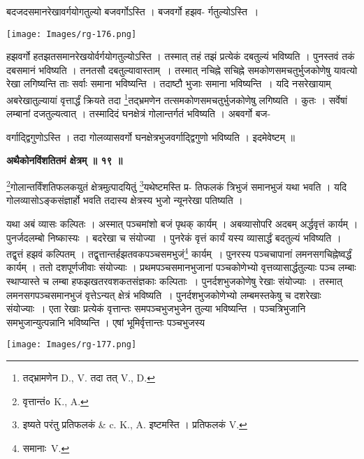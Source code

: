 \documentclass[11pt, openany]{book}
\begin{document}
बदजदसमानरेखावर्गयोगतुल्यो बजवर्गोऽस्ति । बजवर्गो हझव-
र्गतुल्योऽस्ति~। 
\begin{center}
\texttt{[image: Images/rg-176.png]}  
\end{center}
हझवर्गो हतझतसमानरेखयोर्वर्गयोगतुल्योऽस्ति । तस्मात् तहं तझं प्रत्येकं दबतुल्यं भविष्यति । पुनस्तवं तकं दबसमानं भविष्यति । तनतसौ दबतुल्यावास्ताम्~। तस्मात् नचिह्ने सचिह्ने समकोणसमचतुर्भुजकोणेषु यावत्यो रेखा लगिष्यन्ति ताः सर्वाः समाना भविष्यन्ति । तदाष्टौ भुजाः समाना भविष्यन्ति~। यदि नसरेखायाम् अबरेखातुल्यायां वृत्तार्द्धं क्रियते तदा \renewcommand{\thefootnote}{१}\footnote{तद्भ्रामणेन {\en D., V.} तदा तत् {\en V., D.}}तद्भ्रमणेन तत्समकोणसमचतुर्भुजकोणेषु लगिष्यति । कुतः । सर्वेषां लम्बानां दजतुल्यत्वात् । तस्मादिदं घनक्षेत्रं गोलान्तर्गतं भविष्यति । अबवर्गो बज-

\newpage
\noindent वर्गाद्द्विगुणोऽस्ति । तदा गोलव्यासवर्गो घनक्षेत्रभुजवर्गाद्द्विगुणो
भविष्यति । इदमेवेष्टम् ॥\\
\begin{center}
\textbf{\large अथैकोनविंशतितमं क्षेत्रम् ॥ १९ ॥ }
\end{center}
\vspace{5mm}

{\ab \renewcommand{\thefootnote}{१}\footnote{वृत्तान्तं० {\en K., A.} }गोलान्तर्विंशतिफलकयुतं क्षेत्रमुत्पादयितुं \renewcommand{\thefootnote}{२}\footnote{इष्यते परंतु प्रतिफलकं {\en \& c. K., A.} इष्टमस्ति । प्रतिफलकं {\en V.}}यथेष्टमस्ति प्र-
तिफलकं त्रिभुजं समानभुजं यथा भवति । यदि गोलव्यासोऽङ्कसंज्ञार्हो भवति तदास्य क्षेत्रस्य भुजो न्यूनरेखा पतिष्यति । }\\
\vspace{3mm}

यथा अबं व्यासः कल्पितः । अस्मात् पञ्चमांशो बजं पृथक् कार्यम् । अबव्यासोपरि अदबम् अर्द्धवृत्तं कार्यम् । पुनर्जदलम्बो निष्कास्यः । बदरेखा च संयोज्या~। पुनरेकं वृत्तं कार्यं यस्य व्यासार्द्धं बदतुल्यं भविष्यति । तद्वृत्तं हझवं कल्पितम् । तद्वृत्तान्तर्हझतवकपञ्चसमभुजं\renewcommand{\thefootnote}{३}\footnote{समानाः~{\en V.}} कार्यम्~। पुनरस्य पञ्चचापानां लमनसगचिह्नेष्वर्द्धं कार्यम् । ततो दशपूर्णजीवाः संयोज्याः । प्रथमपञ्चसमानभुजानां पञ्चकोणेभ्यो वृत्तव्यासार्द्धतुल्याः पञ्च लम्बाः स्थाप्यास्ते च लम्बा हफझखतरवशकतसंज्ञकाः कल्पिताः~। पुनर्दशभुजकोणेषु रेखाः संयोज्याः । तस्मात् लमनसगपञ्चसमानभुजं वृत्तेऽन्यत् क्षेत्रं भविष्यति~। पुनर्दशभुजकोणेभ्यो लम्बमस्तकेषु च दशरेखाः संयोज्याः~। एता रेखाः प्रत्येकं वृत्तान्तः समपञ्चभुजभुजेन तुल्या भविष्यन्ति । पञ्चत्रिभुजानि समभुजान्युत्पन्नानि भविष्यन्ति । एषां भूमिर्वृत्तान्तः पञ्चभुजस्य\\
\begin{center}
\texttt{[image: Images/rg-177.png]}  
\end{center} 
\end{document}

